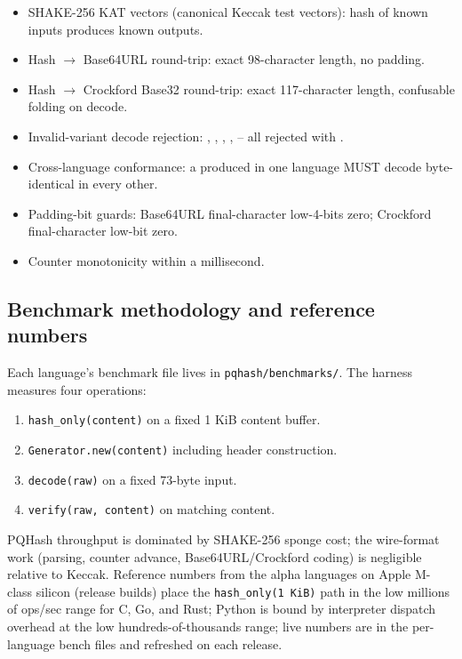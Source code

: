 \begin{itemize}
\item SHAKE-256 KAT vectors (canonical Keccak test vectors): hash of known inputs produces known outputs.
\item Hash $\to$ Base64URL round-trip: exact 98-character length, no padding.
\item Hash $\to$ Crockford Base32 round-trip: exact 117-character length, confusable folding on decode.
\item Invalid-variant decode rejection: , , , , -- all rejected with .
\item Cross-language conformance: a \pqhash{} produced in one language MUST decode byte-identical in every other.
\item Padding-bit guards: Base64URL final-character low-4-bits zero; Crockford final-character low-bit zero.
\item Counter monotonicity within a millisecond.
\end{itemize}

\subsection{Benchmark methodology and reference numbers}
\label{sec:conformance:bench}

Each language's benchmark file lives in \texttt{pqhash/benchmarks/}. The harness measures four operations:

\begin{enumerate}
\item \texttt{hash\_only(content)} on a fixed 1 KiB content buffer.
\item \texttt{Generator.new(content)} including header construction.
\item \texttt{decode(raw)} on a fixed 73-byte input.
\item \texttt{verify(raw, content)} on matching content.
\end{enumerate}

PQHash throughput is dominated by SHAKE-256 sponge cost; the wire-format work (parsing, counter advance, Base64URL/Crockford coding) is negligible relative to Keccak. Reference numbers from the alpha languages on Apple M-class silicon (release builds) place the \texttt{hash\_only(1\,KiB)} path in the low millions of ops/sec range for C, Go, and Rust; Python is bound by interpreter dispatch overhead at the low hundreds-of-thousands range; live numbers are in the per-language bench files and refreshed on each release.
